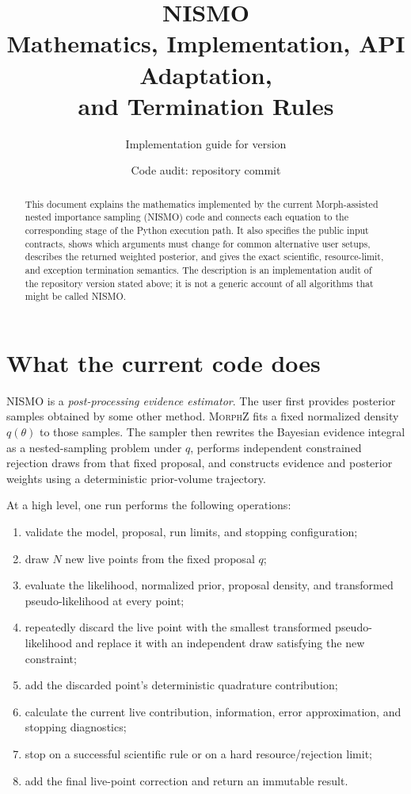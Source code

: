 \documentclass[11pt,a4paper]{article}
\title{\textbf{NISMO}\\
Mathematics, Implementation, API Adaptation,\\
and Termination Rules}
\author{Implementation guide for \code{nismo} version \code{0.1.0.dev3}}
\date{Code audit: repository commit \code{934195f}}
\newcommand{\NISMO}{\textsc{NISMO}}
\newcommand{\MorphZ}{\textsc{MorphZ}}
\begin{document}
\maketitle

\begin{abstract}
This document explains the mathematics implemented by the current
Morph-assisted nested importance sampling (\NISMO) code and connects each
equation to the corresponding stage of the Python execution path.  It also
specifies the public input contracts, shows which arguments must change for
common alternative user setups, describes the returned weighted posterior,
and gives the exact scientific, resource-limit, and exception termination
semantics.  The description is an implementation audit of the repository
version stated above; it is not a generic account of all algorithms that might
be called NISMO.
\end{abstract}

\tableofcontents
\newpage

\section{What the current code does}

\NISMO{} is a \emph{post-processing evidence estimator}.  The user first
provides posterior samples obtained by some other method.  \MorphZ{} fits a
fixed normalized density \(q(\theta)\) to those samples.  The sampler then
rewrites the Bayesian evidence integral as a nested-sampling problem under
\(q\), performs independent constrained rejection draws from that fixed
proposal, and constructs evidence and posterior weights using a deterministic
prior-volume trajectory.

At a high level, one run performs the following operations:

\begin{enumerate}
  \item validate the model, proposal, run limits, and stopping configuration;
  \item draw \(N\) new live points from the fixed proposal \(q\);
  \item evaluate the likelihood, normalized prior, proposal density, and
        transformed pseudo-likelihood at every point;
  \item repeatedly discard the live point with the smallest transformed
        pseudo-likelihood and replace it with an independent draw satisfying
        the new constraint;
  \item add the discarded point's deterministic quadrature contribution;
  \item calculate the current live contribution, information, error
        approximation, and stopping diagnostics;
  \item stop on a successful scientific rule or on a hard resource/rejection
        limit;
  \item add the final live-point correction and return an immutable result.
\end{enumerate}
\end{document}
